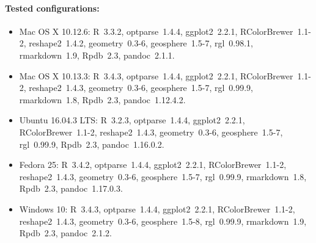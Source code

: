 \documentclass[a4paper,10pt]{article}
\begin{document}
\paragraph{Tested configurations:}
\begin{itemize}
\item Mac OS X 10.12.6: R~3.3.2, optparse~1.4.4, ggplot2~2.2.1, RColorBrewer~1.1-2, reshape2~1.4.2, geometry~0.3-6, geosphere~1.5-7, rgl~0.98.1, rmarkdown~1.9, Rpdb~2.3, pandoc~2.1.1.
\item Mac OS X 10.13.3: R~3.4.3, optparse~1.4.4, ggplot2~2.2.1, RColorBrewer~1.1-2, reshape2~1.4.3, geometry~0.3-6, geosphere~1.5-7, rgl~0.99.9, rmarkdown~1.8, Rpdb~2.3, pandoc~1.12.4.2.
\item Ubuntu 16.04.3 LTS: R~3.2.3, optparse~1.4.4, ggplot2~2.2.1, RColorBrewer~1.1-2, reshape2~1.4.3, geometry~0.3-6, geosphere~1.5-7, rgl~0.99.9, Rpdb~2.3, pandoc~1.16.0.2.
\item Fedora 25: R~3.4.2, optparse~1.4.4, ggplot2~2.2.1, RColorBrewer~1.1-2, reshape2~1.4.3, geometry~0.3-6, geosphere~1.5-7, rgl~0.99.9, rmarkdown~1.8, Rpdb~2.3, pandoc~1.17.0.3.
\item Windows 10: R~3.4.3, optparse~1.4.4, ggplot2~2.2.1, RColorBrewer~1.1-2, reshape2~1.4.3, geometry~0.3-6, geosphere~1.5-8, rgl~0.99.9, rmarkdown~1.9, Rpdb~2.3, pandoc~2.1.2.
\end{itemize}
\end{document}
